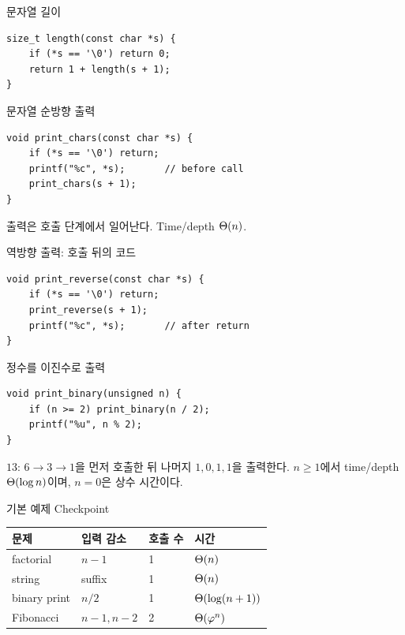 \begin{frame}[fragile]{문자열 길이}\begin{lstlisting}
size_t length(const char *s) {
    if (*s == '\0') return 0;
    return 1 + length(s + 1);
}
\end{lstlisting}
\end{frame}
\begin{frame}[fragile]{문자열 순방향 출력}\begin{lstlisting}
void print_chars(const char *s) {
    if (*s == '\0') return;
    printf("%c", *s);       // before call
    print_chars(s + 1);
}
\end{lstlisting}출력은 호출 단계에서 일어난다. Time/depth $\Theta(n)$.
\end{frame}
\begin{frame}[fragile]{역방향 출력: 호출 뒤의 코드}\begin{lstlisting}
void print_reverse(const char *s) {
    if (*s == '\0') return;
    print_reverse(s + 1);
    printf("%c", *s);       // after return
}
\end{lstlisting}
\end{frame}
\begin{frame}[fragile]{정수를 이진수로 출력}\begin{lstlisting}
void print_binary(unsigned n) {
    if (n >= 2) print_binary(n / 2);
    printf("%u", n % 2);
}
\end{lstlisting}$13$: $6\to3\to1$을 먼저 호출한 뒤 나머지 $1,0,1,1$을 출력한다.
\vfill $n\ge1$에서 time/depth $\Theta(\log n)$이며, $n=0$은 상수 시간이다.
\end{frame}
\begin{frame}{기본 예제 Checkpoint}\begin{tabular}{@{}llll@{}}\toprule 문제&입력 감소&호출 수&시간\\\midrule factorial&$n-1$&1&$\Theta(n)$\\string&suffix&1&$\Theta(n)$\\binary print&$n/2$&1&$\Theta(\log(n+1))$\\Fibonacci&$n-1,n-2$&2&$\Theta(\varphi^n)$\\\bottomrule\end{tabular}
\vfill{}
\end{frame}
